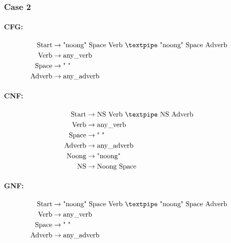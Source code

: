 \subsubsection{Case 2}

\paragraph{CFG:}

\begin{equation*}
    \begin{aligned}
        \text{Start}  & \rightarrow \text{"noong" Space Verb {\textpipe} "noong" Space Adverb} \\
        \text{Verb}   & \rightarrow \text{any\_verb}                                           \\
        \text{Space}  & \rightarrow \text{" "}                                                 \\
        \text{Adverb} & \rightarrow \text{any\_adverb}
    \end{aligned}
\end{equation*}

\paragraph{CNF:}

\begin{equation*}
    \begin{aligned}
        \text{Start}  & \rightarrow \text{NS Verb {\textpipe} NS Adverb} \\
        \text{Verb}   & \rightarrow \text{any\_verb}                     \\
        \text{Space}  & \rightarrow \text{" "}                           \\
        \text{Adverb} & \rightarrow \text{any\_adverb}                   \\
        \text{Noong}  & \rightarrow \text{"noong"}                       \\
        \text{NS}     & \rightarrow \text{Noong Space}
    \end{aligned}
\end{equation*}

\paragraph{GNF:}

\begin{equation*}
    \begin{aligned}
        \text{Start}  & \rightarrow \text{"noong" Space Verb {\textpipe} "noong" Space Adverb} \\
        \text{Verb}   & \rightarrow \text{any\_verb}                                           \\
        \text{Space}  & \rightarrow \text{" "}                                                 \\
        \text{Adverb} & \rightarrow \text{any\_adverb}
    \end{aligned}
\end{equation*}


